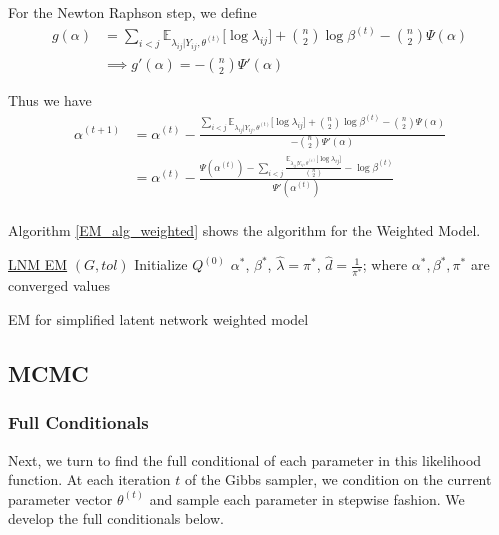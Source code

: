 \documentclass{article}
\begin{document}
For the Newton Raphson step, we define 
\begin{align*}
g(\alpha) &= \sum_{i<j} \mathbb{E}_{\lambda_{ij}|Y_{ij}, \theta^{(t)}} \big[\log \lambda_{ij}\big] + {n \choose 2} \log \beta^{(t)} - {n \choose 2}\Psi(\alpha)\\
	&\implies g'(\alpha) = -{n \choose 2} \Psi'(\alpha)
\end{align*}

Thus we have 
\begin{align*}
\alpha^{(t+1)} &= \alpha^{(t)} - \frac{\sum_{i<j} \mathbb{E}_{\lambda_{ij}|Y_{ij}, \theta^{(t)}} \big[\log \lambda_{ij}\big] + {n \choose 2} \log \beta^{(t)} - {n \choose 2}\Psi(\alpha)}{-{n \choose 2} \Psi'(\alpha)} \\
	&= \alpha^{(t)} - \frac{\Psi(\alpha^{(t)})-\sum_{i<j} \frac{\mathbb{E}_{\lambda_{ij}|Y_{ij}, \theta^{(t)}} \big[\log \lambda_{ij}\big] }{{n \choose 2}}- \log \beta^{(t)} }{ \Psi'(\alpha^{(t)})} \tag{$\alpha_W$}\\
\end{align*}

Algorithm \ref{EM_alg_weighted} shows the algorithm for the Weighted Model. 

\begin{algorithm*}
    \underline{LNM EM} $(G, tol)$\;
    Initialize $Q^{(0)}$
     \Return $\alpha^*$, $\beta^*$, $\hat{\lambda} = \pi^*$, $\hat{d} = \frac{1}{\pi^*}$; where $\alpha^*, \beta^*, \pi^*$ are converged values \
    \caption{EM for simplified latent network weighted model}
    \label{EM_alg_weighted}
\end{algorithm*}

\subsection{MCMC}\label{MCMC}
\subsubsection{Full Conditionals}
Next, we turn to find the full conditional of each parameter in this likelihood function. At each iteration $t$ of the Gibbs sampler, we condition on the current parameter vector $\theta^{(t)}$ and sample each parameter in stepwise fashion. We develop the full conditionals below.
\end{document}
